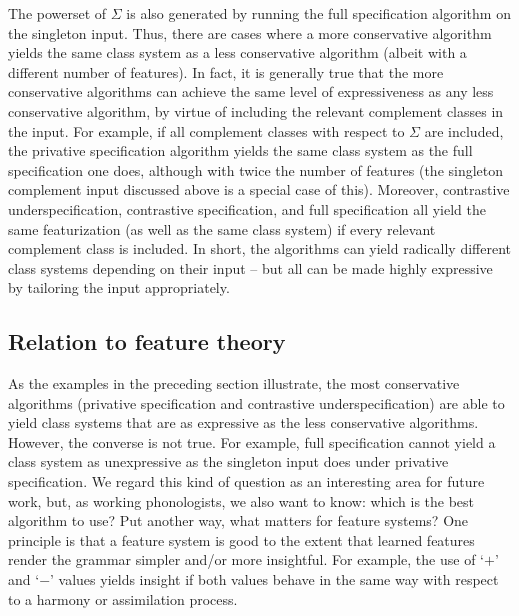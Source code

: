 \documentclass[11pt, oneside]{article}   	%
\begin{document}
The powerset of $\Sigma$ is also generated by running the full specification algorithm on the singleton input. Thus, there are cases where a more conservative algorithm yields the same class system as a less conservative algorithm (albeit with a different number of features). In fact, it is generally true that the more conservative algorithms can achieve the same level of expressiveness as any less conservative algorithm, by virtue of including the relevant complement classes in the input. For example, if all complement classes with respect to $\Sigma$ are included, the privative specification algorithm yields the same class system as the full specification one does, although with twice the number of features (the singleton complement input discussed above is a special case of this). Moreover, contrastive underspecification, contrastive specification, and full specification all yield the same featurization (as well as the same class system) if every relevant complement class is included. In short, the algorithms can yield radically different class systems depending on their input -- but all can be made highly expressive by tailoring the input appropriately.

\subsection{Relation to feature theory}

As the examples in the preceding section illustrate, the most conservative algorithms (privative specification and contrastive underspecification) are able to yield class systems that are as expressive as the less conservative algorithms. However, the converse is not true. For example, full specification cannot yield a class system as unexpressive as the singleton input does under privative specification. We regard this kind of question as an interesting area for future work, but, as working phonologists, we also want to know: which is the best algorithm to use? Put another way, what matters for feature systems? One principle is that a feature system is good to the extent that learned features render the grammar simpler and/or more insightful. For example, the use of `$+$' and `$-$' values yields insight if both values behave in the same way with respect to a harmony or assimilation process.
\end{document}

